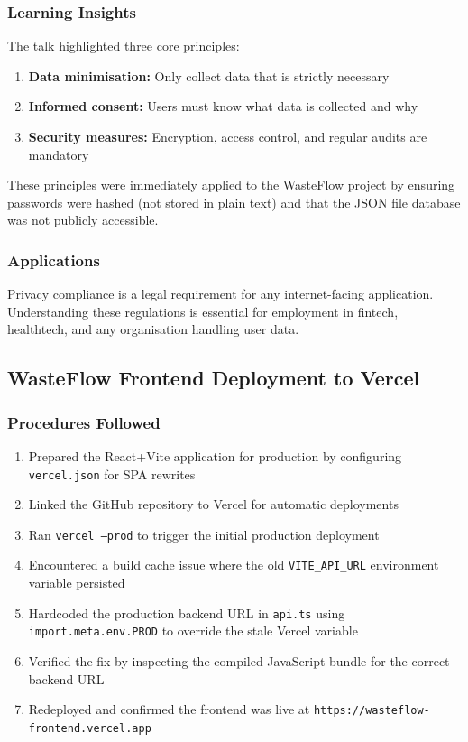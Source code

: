 \documentclass[12pt,a4paper]{article}
\begin{document}
\subsubsection*{Learning Insights}
The talk highlighted three core principles:
\begin{enumerate}
    \item \textbf{Data minimisation:} Only collect data that is strictly necessary
    \item \textbf{Informed consent:} Users must know what data is collected and why
    \item \textbf{Security measures:} Encryption, access control, and regular audits are mandatory
\end{enumerate}
These principles were immediately applied to the WasteFlow project by ensuring passwords were hashed (not stored in plain text) and that the JSON file database was not publicly accessible.

\subsubsection*{Applications}
Privacy compliance is a legal requirement for any internet-facing application. Understanding these regulations is essential for employment in fintech, healthtech, and any organisation handling user data.

\subsection{WasteFlow Frontend Deployment to Vercel}
\label{subsec:wasteflow_frontend}

\subsubsection*{Procedures Followed}
\begin{enumerate}
    \item Prepared the React+Vite application for production by configuring \texttt{vercel.json} for SPA rewrites
    \item Linked the GitHub repository to Vercel for automatic deployments
    \item Ran \texttt{vercel --prod} to trigger the initial production deployment
    \item Encountered a build cache issue where the old \texttt{VITE\_API\_URL} environment variable persisted
    \item Hardcoded the production backend URL in \texttt{api.ts} using \texttt{import.meta.env.PROD} to override the stale Vercel variable
    \item Verified the fix by inspecting the compiled JavaScript bundle for the correct backend URL
    \item Redeployed and confirmed the frontend was live at \texttt{https://wasteflow-frontend.vercel.app}
\end{enumerate}
\end{document}
